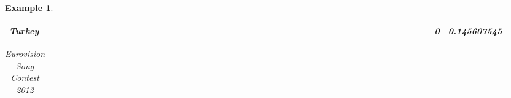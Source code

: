 \documentclass[a4paper,11pt]{report}
\newtheorem{example}[theorem]{Example}
\begin{document}
\begin{example}
\begin{appendices}
\begin{landscape}
\begin{longtable}{r|r|r|r|r|r|r|r|r|r|r|r|r|r|r|r|r|r|r|r|r|r|r|r|r|r|r|r|r|r|r|r|r|r|r|r|r|r|r|r|r|r|r|r|r|r|r|r|}
\multicolumn{1}{|r|}{\textbf{Turkey}}                &                  &                  &                  &                     &                  &                  &                                &                   &                  &                 &                  &                  &                           &                  &                 &                  &                  &                 &                  &                  &                  &                 &                &                 &                    &                &                  &                 &                 &                   &                  &                 &                     &                 &                   &                   &                &                 &                      &                          &                 &                  &                         &                 &                & 0                        & 0.145607545        \\ \hline
\end{longtable}
\footnotesize
\begin{longtable}{r|r|r|r|r|r|r|r|r|r|r|r|r|r|r|r|r|r|r|r|r|r|r|r|r|r|r|r|r|r|r|r|r|r|r|r|r|r|r|r|r|r|r|r|r|r|r|}
\caption{Eurovision Song Contest 2012}\\
\cline{2-47} 

\end{longtable}
\end{landscape}
\end{appendices}
\end{example}
\end{document}
